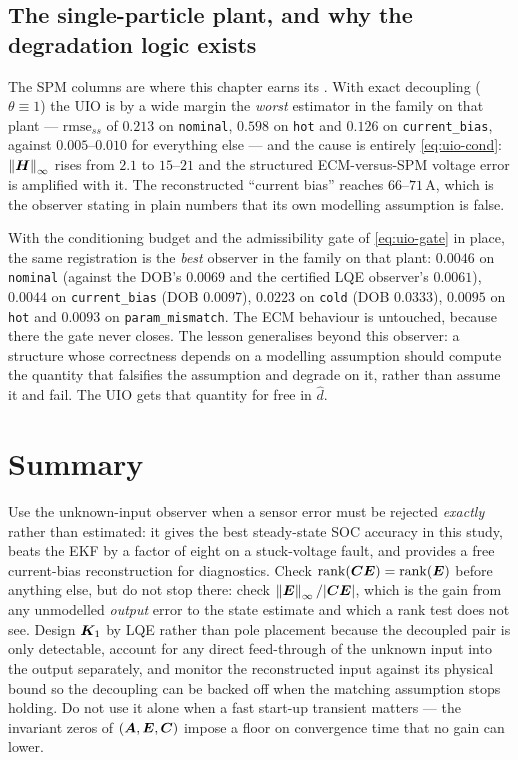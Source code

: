 \subsection*{The single-particle plant, and why the degradation logic exists}
The SPM columns are where this chapter earns its .  With exact decoupling
($\theta\equiv1$) the UIO is by a wide margin the \emph{worst} estimator in the family on that
plant --- $\mathrm{rmse}_{ss}$ of $0.213$ on \texttt{nominal}, $0.598$ on \texttt{hot} and
$0.126$ on \texttt{current\_bias}, against $0.005$--$0.010$ for everything else --- and the cause
is entirely \eqref{eq:uio-cond}: $\left\lVert \bm{H} \right\rVert_\infty$ rises from $2.1$ to $15$--$21$ and the
structured ECM-versus-SPM voltage error is amplified with it.  The reconstructed ``current bias''
reaches $66$--$71$\,A, which is the observer stating in plain numbers that its own modelling
assumption is false.

With the conditioning budget and the admissibility gate of \eqref{eq:uio-gate} in place, the same
registration is the \emph{best} observer in the family on that plant: $0.0046$ on
\texttt{nominal} (against the DOB's $0.0069$ and the certified LQE observer's $0.0061$), $0.0044$
on \texttt{current\_bias} (DOB $0.0097$), $0.0223$ on \texttt{cold} (DOB $0.0333$), $0.0095$ on
\texttt{hot} and $0.0093$ on \texttt{param\_mismatch}.  The ECM behaviour is untouched, because
there the gate never closes.  The lesson generalises beyond this observer: a structure whose
correctness depends on a modelling assumption should compute the quantity that falsifies the
assumption and degrade on it, rather than assume it and fail.  The UIO gets that quantity for
free in $\hat{d}$.

\section{Summary}
Use the unknown-input observer when a sensor error must be rejected \emph{exactly} rather than
estimated: it gives the best steady-state SOC accuracy in this study, beats the EKF by a factor
of eight on a stuck-voltage fault, and provides a free current-bias reconstruction for
diagnostics.  Check $\operatorname{rank}(\bm{C}\bm{E}) = \operatorname{rank}(\bm{E})$ before anything
else, but do not stop there: check $\left\lVert \bm{E} \right\rVert_\infty/|\bm{C}\bm{E}|$, which is the gain from any
unmodelled \emph{output} error to the state estimate and which a rank test does not see.  Design
$\bm{K}_1$ by LQE rather than pole placement because the decoupled pair is only detectable, account
for any direct feed-through of the unknown input into the output separately, and monitor the
reconstructed input against its physical bound so the decoupling can be backed off when the
matching assumption stops holding.  Do not use it alone when a fast start-up transient matters ---
the invariant zeros of $(\bm{A},\bm{E},\bm{C})$ impose a floor on convergence time that no gain can
lower.
